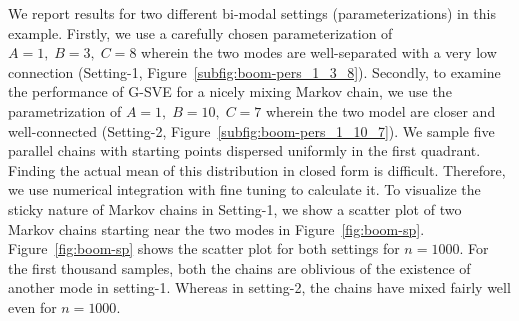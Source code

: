 \documentclass[11pt]{article}
\theoremstyle{remark}
\begin{document}
We report results for two different bi-modal settings (parameterizations) in this example. Firstly, we use a carefully chosen parameterization of $A = 1,\; B = 3,\; C = 8$ wherein the two modes are well-separated with a very low connection (Setting-1, Figure~\ref{subfig:boom-pers_1_3_8}). Secondly, to examine the performance of G-SVE for a nicely mixing Markov chain, we use the parametrization of $A = 1, \; B = 10, \; C=7$ wherein the two model are closer and well-connected (Setting-2, Figure~\ref{subfig:boom-pers_1_10_7}). We sample five parallel chains with starting points dispersed uniformly in the first quadrant. Finding the actual mean of this distribution in closed form is difficult. Therefore, we use numerical integration with fine tuning to calculate it. To visualize the sticky nature of Markov chains in Setting-1, we show a scatter plot of two Markov chains starting near the two modes in Figure~\ref{fig:boom-sp}. Figure~\ref{fig:boom-sp} shows the scatter plot for both settings for $n=1000$. For the first thousand samples, both the chains are oblivious of the existence of another mode in setting-1. Whereas in setting-2, the chains have mixed fairly well even for $n=1000$.
\end{document}
